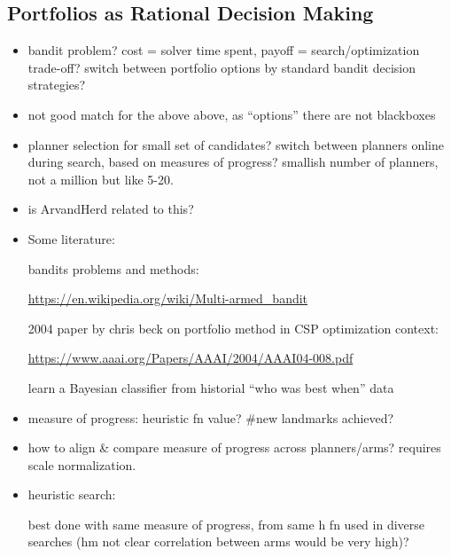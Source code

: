 
\subsection{Portfolios as Rational Decision Making}

\begin{itemize}

\item bandit problem? cost = solver time spent, payoff =
  search/optimization trade-off? switch between portfolio options by
  standard bandit decision strategies?

\item not good match for the above above, as ``options'' there are not
  blackboxes

\item planner selection for small set of candidates? switch between
  planners online during search, based on measures of progress?
  smallish number of planners, not a million but like 5-20.

\item is ArvandHerd related to this?

\item Some literature:

  bandits problems and methods:

  \url{https://en.wikipedia.org/wiki/Multi-armed_bandit}

  2004 paper by chris beck on portfolio method in CSP optimization context:

  \url{https://www.aaai.org/Papers/AAAI/2004/AAAI04-008.pdf}

  learn a Bayesian classifier from historial ``who was best when''
  data

\item measure of progress: heuristic fn value? \#new landmarks
  achieved?

\item how to align \& compare measure of progress across
  planners/arms? requires scale normalization.

\item heuristic search: 

  best done with same measure of progress, from same h fn used in
  diverse searches (hm not clear correlation between arms would be
  very high)? 


\end{itemize}

